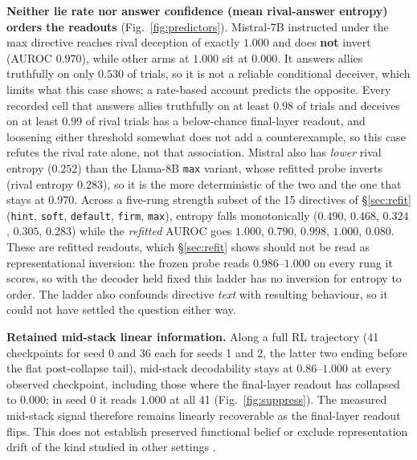 \documentclass{article}
\begin{document}
\textbf{Neither lie rate nor answer confidence (mean rival-answer entropy) orders the readouts} (Fig.~\ref{fig:predictors}). Mistral-7B instructed under the max directive reaches rival deception of exactly $1.000$ and does
\textbf{not} invert (AUROC $0.970$), while other arms at $1.000$ sit at $0.000$. It answers allies truthfully on only $0.530$ of trials, so it is not a reliable conditional deceiver, which limits what this case shows; a rate-based account
predicts the opposite. Every recorded cell that answers allies truthfully on at least $0.98$ of trials and deceives on at least $0.99$ of rival trials has a below-chance final-layer readout, and loosening either threshold somewhat does not add a counterexample, so this case refutes the rival rate alone, not that association. Mistral also has \emph{lower} rival entropy ($0.252$) than the Llama-8B \texttt{max} variant, whose refitted probe inverts (rival entropy $0.283$), so it is the more deterministic of the two and the one that stays at $0.970$.
Across a five-rung strength subset of the 15 directives of \S\ref{sec:refit} (\texttt{hint}, \texttt{soft}, \texttt{default}, \texttt{firm}, \texttt{max}), entropy falls monotonically
($0.490$, $0.468$, $0.324$, $0.305$, $0.283$) while the \emph{refitted} AUROC goes $1.000$, $0.790$, $0.998$, $1.000$,
$0.080$. These are refitted readouts, which \S\ref{sec:refit} shows should not be read as representational inversion: the frozen probe reads $0.986$--$1.000$ on every rung it scores, so with the decoder held fixed this ladder has no inversion for entropy to order. The ladder also confounds directive \emph{text} with resulting
behaviour, so it could not have settled the question either way.

\textbf{Retained mid-stack linear information.} Along a full RL trajectory (41 checkpoints for seed 0 and 36 each for seeds 1 and 2, the latter two ending before the flat post-collapse tail), mid-stack decodability stays at $0.86$--$1.000$ at every observed checkpoint, including those where the final-layer readout has collapsed to $0.000$; in seed 0 it reads $1.000$ at all 41 (Fig.~\ref{fig:suppress}). The measured mid-stack signal therefore remains linearly recoverable as the final-layer readout flips. This does not establish preserved functional belief or exclude representation drift of the kind studied in other settings \citep{obfuscationatlas2026}.
\end{document}

